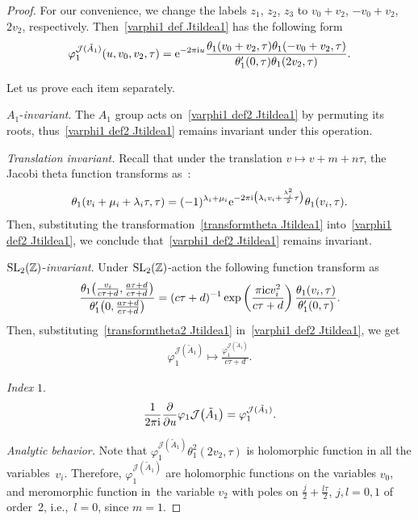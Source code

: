 \documentclass[10pt,a4paper]{amsart}
\numberwithin{equation}{section}
\newcommand{\Ja}{\mathcal{J}}
\begin{document}
\begin{proof}
 For our convenience, we change the labels $z_1$, $z_2$, $z_3$ to $v_0+v_2$, $-v_0+v_2$, $2v_2$, respectively. Then~\eqref{varphi1 def Jtildea1} has the following form
\begin{gather}
\label{varphi1 def2 Jtildea1}
\varphi_1^{\Ja(\tilde A_1)}(u,v_0,v_2,\tau)={\rm e}^{-2\pi {\rm i} u}\frac{\theta_1(v_0+v_2,\tau)\theta_1(-v_0+v_2,\tau)}{\theta_1^{\prime}(0,\tau) \theta_1(2v_2,\tau)}.
\end{gather}

Let us prove each item separately.

 $A_1$-\emph{invariant}.
The $A_1$ group acts on~\eqref{varphi1 def2 Jtildea1} by permuting its roots, thus~\eqref{varphi1 def2 Jtildea1} remains invariant under this operation.

 \emph{Translation invariant.}
 Recall that under the translation $v\mapsto v+m+n\tau$, the Jacobi theta function transforms as~\cite{BertolaM.1, E.T.WhittakerandG.N.Watson}:
\begin{gather}\label{transformtheta Jtildea1}
\theta_1(v_i+\mu_i+\lambda_i\tau,\tau)=(-1)^{\lambda_i+\mu_i}{\rm e}^{-2\pi {\rm i}\big(\lambda_iv_i+\frac{\lambda_i^2}{2}\tau\big)}\theta_1(v_i,\tau).
\end{gather}
Then, substituting the transformation~\eqref{transformtheta Jtildea1} into~\eqref{varphi1 def2 Jtildea1}, we conclude that~\eqref{varphi1 def2 Jtildea1} remains inva\-riant.

 ${\rm SL}_2(\mathbb{Z})$-\emph{invariant}.
Under ${\rm SL}_2(\mathbb{Z})$-action the following function transform as
\begin{gather}
\label{transformtheta2 Jtildea1}
\frac{\theta_1\big(\frac{v_i}{c\tau+d},\frac{a\tau+d}{c\tau+d}\big)}
{\theta_1^{\prime}\big(0,\frac{a\tau+d}{c\tau+d}\big)}
=(c\tau+d)^{-1}\exp\left(\frac{\pi {\rm i} cv_i^2 }{c\tau+d}\right)\frac{\theta_1(v_i,\tau)}{\theta_1^{\prime}(0,\tau)}.
\end{gather}
Then, substituting~\eqref{transformtheta2 Jtildea1} in~\eqref{varphi1 def2 Jtildea1}, we get
\begin{gather*}
\varphi_1^{\Ja(\tilde A_1)}\mapsto \frac{\varphi_1^{\Ja(\tilde A_1)}}{c\tau+d}.
\end{gather*}

 \emph{Index} $1$.
\begin{gather*}
\frac{1}{2\pi {\rm i}}\frac{\partial}{\partial u}\varphi_1{\Ja\big(\tilde A_1\big)}=\varphi_1^{\Ja(\tilde A_1)}.
\end{gather*}

 \emph{Analytic behavior.}
Note that $\varphi_1^{\Ja(\tilde A_1)}\theta_1^2(2v_2,\tau)$ is holomorphic function in all the variables~$v_i$. Therefore, $\varphi_1^{\Ja(\tilde A_1)}$ are holomorphic functions on the variables $v_0$, and meromorphic function in~the variable $v_{2}$ with poles on $\frac{j}{2}+\frac{l\tau}{2}$, $j,l=0,1$ of order~2, i.e.,~$l=0$, since $m=1$.
\end{proof}
\end{document}
